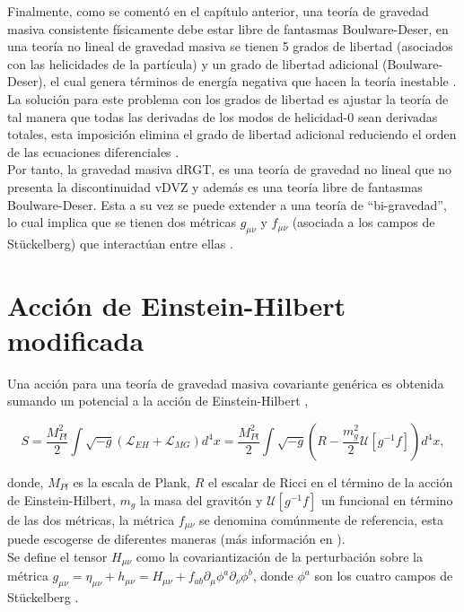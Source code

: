 Finalmente, como se comentó en el capítulo anterior, una teoría de gravedad masiva consistente físicamente debe estar libre de fantasmas Boulware-Deser, en una teoría no lineal de gravedad masiva se tienen 5 grados de libertad (asociados con las helicidades de la partícula) y un grado de libertad adicional (Boulware-Deser), el cual genera términos de energía negativa que hacen la teoría inestable \cite{CosmologicalStudy1}. La solución para este problema con los grados de libertad es ajustar la teoría de tal manera que todas las derivadas de los modos de helicidad-0 sean derivadas totales, esta imposición elimina el grado de libertad adicional reduciendo el orden de las ecuaciones diferenciales \cite{MassiveGravity}.\\

Por tanto, la gravedad masiva dRGT, es una teoría de gravedad no lineal que no presenta la discontinuidad vDVZ y además es una teoría libre de fantasmas Boulware-Deser. Esta a su vez se puede extender a una teoría de ``bi-gravedad'', lo cual implica que se tienen dos métricas $g_{\mu\nu}$ y $f_{\mu\nu}$ (asociada a los campos  de St\"{u}ckelberg) que interactúan entre ellas \cite{GhostFreeMassiveGravity,BlackHolesInMG}.\\

\section{Acción de Einstein-Hilbert modificada}

Una acción para una teoría de gravedad masiva covariante genérica es obtenida sumando un potencial a la acción de Einstein-Hilbert \cite{GhostFreeMassiveGravity},

\begin{equation}
    S=\dfrac{M^2_{Pl}}{2}\int \sqrt{-g}(\mathcal{L}_{EH}+\mathcal{L}_{MG})d^4x=\dfrac{M^2_{Pl}}{2}\int \sqrt{-g}\left(R-\dfrac{m_g^2}{2}\mathcal{U}[g^{-1}f]\right) d^4x,
    \label{eq:Accion1}
\end{equation}

donde, $M_{Pl}$ es la escala de Plank, $R$ el escalar de Ricci en el término de la acción de Einstein-Hilbert, $m_g$ la masa del gravitón y $\mathcal{U}[g^{-1}f]$ un funcional en término de las dos métricas, la métrica $f_{\mu\nu}$ se denomina comúnmente de referencia, esta puede escogerse de diferentes maneras (más información en \cite{GhostFreeMassiveGravity}).\\

Se define el tensor $H_{\mu\nu}$ como la covariantización de la perturbación sobre la métrica $g_{\mu\nu}=\eta_{\mu\nu}+h_{\mu\nu}=H_{\mu\nu}+f_{ab}\partial_\mu\phi^a\partial_\nu\phi^b$, donde $\phi^a$ son los cuatro campos de St\"{u}ckelberg \cite{ResummationOfMG,GeneralizationOfFP}.\\

